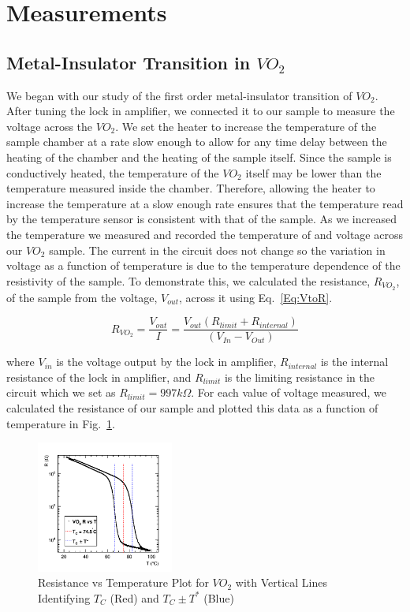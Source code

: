 \documentclass[%
 reprint,
 amsmath,amssymb,
 aps,
 pra,
]{revtex4-1}
\begin{document}
\section{Measurements}
\subsection{Metal-Insulator Transition in $VO_{2}$}
We began with our study of the first order metal-insulator transition of $VO_{2}$. After tuning the lock in amplifier, we connected it to our sample to measure the voltage across the $VO_{2}$. We set the heater to increase the temperature of the sample chamber at a rate slow enough to allow for any time delay between the heating of the chamber and the heating of the sample itself. Since the sample is conductively heated, the temperature of the $VO_{2}$ itself may be lower than the temperature measured inside the chamber. Therefore, allowing the heater to increase the temperature at a slow enough rate ensures that the temperature read by the temperature sensor is consistent with that of the sample. As we increased the temperature we measured and recorded the temperature of and voltage across our $VO_{2}$ sample. The current in the circuit does not change so the variation in voltage as a function of temperature is due to the temperature dependence of the resistivity of the sample. To demonstrate this, we calculated the resistance, $R_{VO_{2}}$, of the sample from the voltage, $V_{out}$, across it using Eq.~\ref{Eq:VtoR}.

\begin{equation}\label{Eq:VtoR}
R_{VO_{2}} = \frac{V_{out}}{I} = \frac{V_{out} (R_{limit} + R_{internal})}{(V_{In} - V_{Out})} 
\end{equation}

where $V_{in}$ is the voltage output by the lock in amplifier, $R_{internal}$ is the internal resistance of the lock in amplifier, and $R_{limit}$ is the limiting resistance in the circuit which we set as $R_{limit} = 997 k\Omega$. For each value of voltage measured, we calculated the resistance of our sample and plotted this data as a function of temperature in Fig.~\ref{Fig:RvT1}.

\begin{figure}[H]
	\centering
	\includegraphics[width=0.4\textwidth]{VO2_RvT_withTC.png}
	\caption{Resistance vs Temperature Plot for $VO_{2}$ with Vertical Lines Identifying $T_{C}$ (Red) and $T_{C} \pm T^{*}$ (Blue)}
	\label{Fig:RvT1}
\end{figure}
\end{document}
